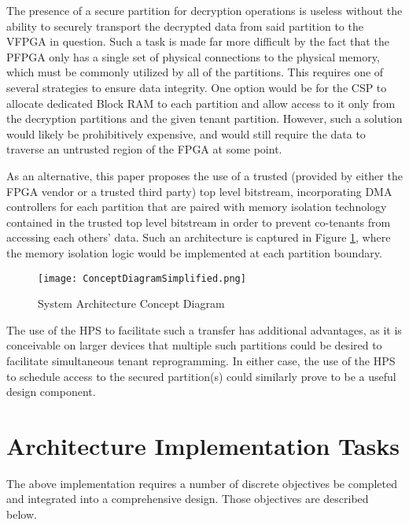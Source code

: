 The presence of a secure partition for decryption operations is useless without the ability to securely transport the decrypted data from said partition to the VFPGA in question. Such a task is made far more difficult by the fact that the PFPGA only has a single set of physical connections to the physical memory, which must be commonly utilized by all of the partitions. This requires one of several strategies to ensure data integrity. One option would be for the CSP to allocate dedicated Block RAM to each partition and allow access to it only from the decryption partitions and the given tenant partition. However, such a solution would likely be prohibitively expensive, and would still require the data to traverse an untrusted region of the FPGA at some point.

As an alternative, this paper proposes the use of a trusted (provided by either the FPGA vendor or a trusted third party) top level bitstream, incorporating DMA controllers for each partition that are paired with memory isolation technology contained in the trusted top level bitstream in order to prevent co-tenants from accessing each others' data. Such an architecture is captured in Figure \ref{fig:topLevelDesign}, where the memory isolation logic would be implemented at each partition boundary.

\begin{figure}
  \centering
  \texttt{[image: ConceptDiagramSimplified.png]}
  \caption{System Architecture Concept Diagram}
  \label{fig:topLevelDesign}
\end{figure}

The use of the HPS to facilitate such a transfer has additional advantages, as it is conceivable on larger devices that multiple such partitions could be desired to facilitate simultaneous tenant reprogramming. In either case, the use of the HPS to schedule access to the secured partition(s) could similarly prove to be a useful design component.

\section{Architecture Implementation Tasks}\label{subsec:Obj}
The above implementation requires a number of discrete objectives be completed and integrated into a comprehensive design. Those objectives are described below.

